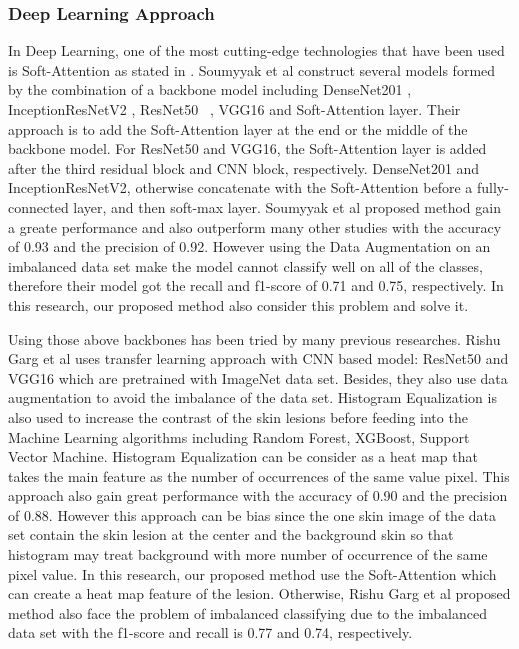 \documentclass[sensors,article,submit,pdftex,moreauthors]{Definitions/mdpi}
\begin{document}
{		\subsubsection{Deep Learning Approach}
		In Deep Learning, one of the most cutting-edge technologies that have been used is Soft-Attention as stated in \mbox{\cite{03358}}. Soumyyak et al construct several models formed by the combination of a backbone model including DenseNet201 \mbox{\cite{06993}}, InceptionResNetV2 \mbox{\cite{00567}}, ResNet50 \mbox{\cite{03385} \cite{05027}}, VGG16 \mbox{\cite{1556}} and Soft-Attention layer. Their approach is to add the Soft-Attention layer at the end or the middle of the backbone model. For ResNet50 and VGG16, the Soft-Attention layer is added after the third residual block and CNN block, respectively. DenseNet201 and InceptionResNetV2, otherwise concatenate with the Soft-Attention before a fully-connected layer, and then soft-max layer. Soumyyak et al proposed method gain a greate performance and also outperform many other studies with the accuracy of 0.93 and the precision of 0.92. However using the Data Augmentation on an imbalanced data set make the model cannot classify well on all of the classes, therefore their model got the recall and f1-score of 0.71 and 0.75, respectively. In this research, our proposed method also consider this problem and solve it.
		
		Using those above backbones has been tried by many previous researches. Rishu Garg et al \mbox{\cite{03798}} uses transfer learning approach with CNN based model: ResNet50 and VGG16 which are pretrained with ImageNet data set. Besides, they also use data augmentation to avoid the imbalance of the data set. Histogram Equalization is also used to increase the contrast of the skin lesions before feeding into the Machine Learning algorithms including Random Forest, XGBoost, Support Vector Machine.	Histogram Equalization can be consider as a heat map that takes the main feature as the number of occurrences of the same value pixel. This approach also gain great performance with the accuracy of 0.90 and the precision of 0.88. However this approach can be bias since the one skin image of the data set contain the skin lesion at the center and the background skin so that histogram may treat background with more number of occurrence of the same pixel value. In this research, our proposed method use the Soft-Attention which can create a heat map feature of the lesion. Otherwise, Rishu Garg et al proposed method also face the problem of imbalanced classifying due to the imbalanced data set with the f1-score and recall is 0.77 and 0.74, respectively.
		
}
\end{document}
